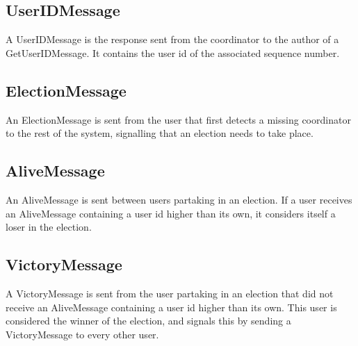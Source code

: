 \documentclass[a4paper, titlepage,12pt]{article}
\begin{document}
\subsection{UserIDMessage}
	A UserIDMessage is the response sent from the coordinator to the author of a GetUserIDMessage. It contains the user id of the associated sequence number.

\subsection{ElectionMessage}
	An ElectionMessage is sent from the user that first detects a missing coordinator to the rest of the system, signalling that an election needs to take place.

\subsection{AliveMessage}
	An AliveMessage is sent between users partaking in an election. If a user receives an AliveMessage containing a user id higher than its own, it considers itself a loser in the election.

\subsection{VictoryMessage}
	A VictoryMessage is sent from the user partaking in an election that did not receive an AliveMessage containing a user id higher than its own. This user is considered the winner of the election, and signals this by sending a VictoryMessage to every other user.
\end{document}
